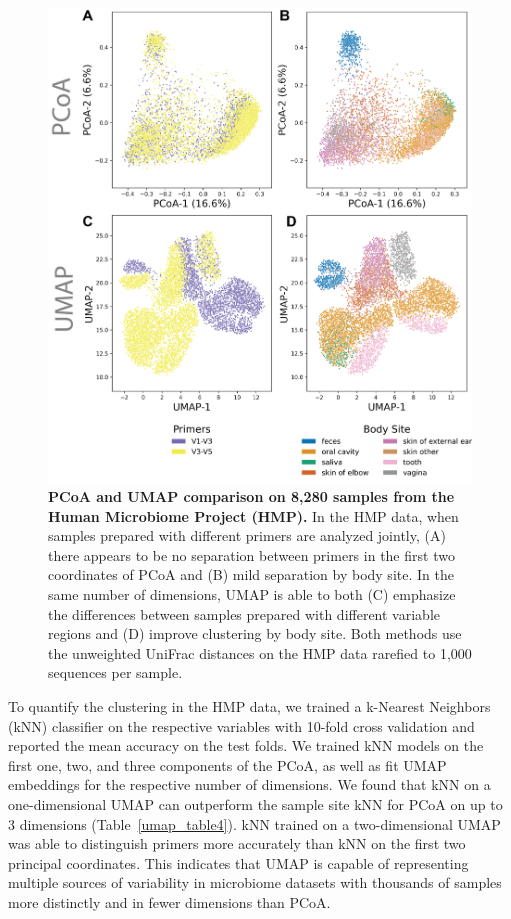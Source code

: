 \begin{figure}[htbp]
\centering
\includegraphics[width=\textwidth]{umap-figures/figure02.png}
\caption[PCoA and UMAP comparison on 8,280 samples from the Human Microbiome Project (HMP).]{\textbf{PCoA and UMAP comparison on 8,280 samples from the Human Microbiome Project (HMP).}  In the HMP data, when samples prepared with different primers are analyzed jointly, (A) there appears to be no separation between primers in the first two coordinates of PCoA and (B) mild separation by body site. In the same number of dimensions, UMAP is able to both (C) emphasize the differences between samples prepared with different variable regions and (D) improve clustering by body site. Both methods use the unweighted UniFrac distances on the HMP data rarefied to 1,000 sequences per sample.}
\label{umap_fig2}
\end{figure}

To quantify the clustering in the HMP data, we trained a k-Nearest Neighbors (kNN) classifier on the respective variables with 10-fold cross validation and reported the mean accuracy on the test folds. We trained kNN models on the first one, two, and three components of the PCoA, as well as fit UMAP embeddings for the respective number of dimensions. We found that kNN on a one-dimensional UMAP can outperform the sample site kNN for PCoA on up to 3 dimensions (Table~\ref{umap_table4}). kNN trained on a two-dimensional UMAP was able to distinguish primers more accurately than kNN on the first two principal coordinates. This indicates that UMAP is capable of representing multiple sources of variability in microbiome datasets with thousands of samples more distinctly and in fewer dimensions than PCoA.

